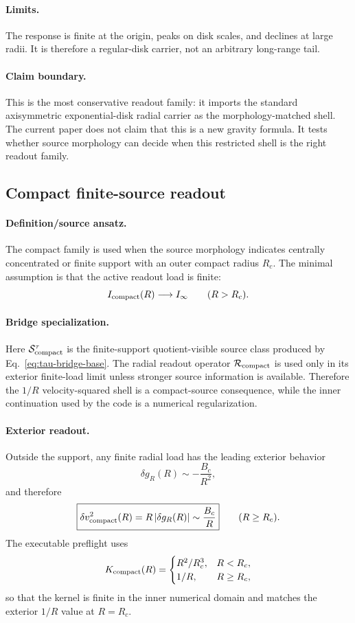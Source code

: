 \documentclass[11pt]{article}
\begin{document}
\paragraph{Limits.}
The response is finite at the origin, peaks on disk scales, and declines at
large radii.  It is therefore a regular-disk carrier, not an arbitrary
long-range tail.

\paragraph{Claim boundary.}
This is the most conservative readout family: it imports the standard
axisymmetric exponential-disk radial carrier as the morphology-matched shell.
The current paper does not claim that this is a new gravity formula.  It tests
whether source morphology can decide when this restricted shell is the right
readout family.

\subsection{Compact finite-source readout}

\paragraph{Definition/source ansatz.}
The compact family is used when the source morphology indicates centrally
concentrated or finite support with an outer compact radius \(R_c\).  The
minimal assumption is that the active readout load is finite:
\[
I_{\rm compact}(R)\longrightarrow I_\infty
\qquad (R>R_c).
\]

\paragraph{Bridge specialization.}
Here \(\mathcal S_{\rm compact}^\tau\) is the finite-support quotient-visible
source class produced by Eq.~\eqref{eq:tau-bridge-base}.  The radial readout
operator \(\mathcal R_{\rm compact}\) is used only in its exterior finite-load
limit unless stronger source information is available.  Therefore the
\(1/R\) velocity-squared shell is a compact-source consequence, while the
inner continuation used by the code is a numerical regularization.

\paragraph{Exterior readout.}
Outside the support, any finite radial load has the leading exterior behavior
\[
\delta g_R(R)\sim -\frac{B_c}{R^2},
\]
and therefore
\[
\boxed{
\delta v_{\rm compact}^2(R)=R\,|\delta g_R(R)|
\sim
\frac{B_c}{R}
}
\qquad (R\ge R_c).
\]
The executable preflight uses
\[
K_{\rm compact}(R)=
\begin{cases}
R^2/R_c^3, & R<R_c,\\
1/R, & R\ge R_c,
\end{cases}
\]
so that the kernel is finite in the inner numerical domain and matches the
exterior \(1/R\) value at \(R=R_c\).
\end{document}
